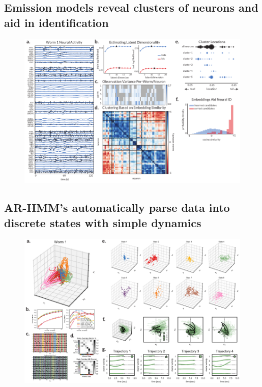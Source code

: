 \documentclass{article}
\begin{document}
\subsection*{Emission models reveal clusters of neurons and aid in identification}

\begin{figure}[t]
\centering%
\includegraphics[width=6in]{figures/figure2} 
\caption{}
\label{fig:emissions}
\end{figure}


\subsection*{AR-HMM's automatically parse data into discrete states with simple dynamics}

\begin{figure}[t]
\centering%
\includegraphics[width=6in]{figures/figure3} 
\caption{}
\label{fig:syllables}
\end{figure}
\end{document}
